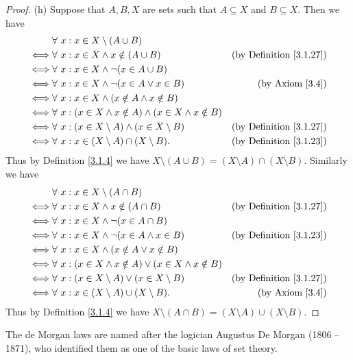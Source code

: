 \begin{proof}{(h)}
Suppose that \(A, B, X\) are sets such that \(A \subseteq X\) and \(B \subseteq X\).
Then we have
\begin{align*}
& \forall\ x : x \in X \setminus (A \cup B) \\
\iff & \forall\ x : x \in X \land x \notin (A \cup B) & \text{(by Definition \ref{3.1.27})} \\
\iff & \forall\ x : x \in X \land \lnot (x \in A \cup B) \\
\iff & \forall\ x : x \in X \land \lnot (x \in A \lor x \in B) & \text{(by Axiom \ref{3.4})} \\
\iff & \forall\ x : x \in X \land (x \notin A \land x \notin B) \\
\iff & \forall\ x : (x \in X \land x \notin A) \land (x \in X \land x \notin B) \\
\iff & \forall\ x : (x \in X \setminus A) \land (x \in X \setminus B) & \text{(by Definition \ref{3.1.27})} \\
\iff & \forall\ x : x \in (X \setminus A) \cap (X \setminus B). & \text{(by Definition \ref{3.1.23})}
\end{align*}
Thus by Definition \ref{3.1.4} we have \(X \setminus (A \cup B) = (X \setminus A) \cap (X \setminus B)\).
Similarly we have
\begin{align*}
& \forall\ x : x \in X \setminus (A \cap B) \\
\iff & \forall\ x : x \in X \land x \notin (A \cap B) & \text{(by Definition \ref{3.1.27})} \\
\iff & \forall\ x : x \in X \land \lnot (x \in A \cap B) \\
\iff & \forall\ x : x \in X \land \lnot (x \in A \land x \in B) & \text{(by Definition \ref{3.1.23})} \\
\iff & \forall\ x : x \in X \land (x \notin A \lor x \notin B) \\
\iff & \forall\ x : (x \in X \land x \notin A) \lor (x \in X \land x \notin B) \\
\iff & \forall\ x : (x \in X \setminus A) \lor (x \in X \setminus B) & \text{(by Definition \ref{3.1.27})} \\
\iff & \forall\ x : x \in (X \setminus A) \cup (X \setminus B). & \text{(by Axiom \ref{3.4})}
\end{align*}
Thus by Definition \ref{3.1.4} we have \(X \setminus (A \cap B) = (X \setminus A) \cup (X \setminus B)\).
\end{proof}

\begin{remark}\label{3.1.29}
The de Morgan laws are named after the logician Augustus De Morgan (1806 -- 1871), who identified them as one of the basic laws of set theory.
\end{remark}

